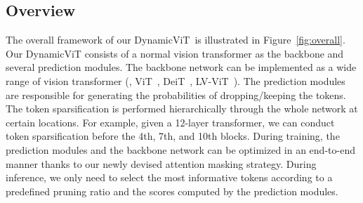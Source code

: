 \documentclass{article}
\newcommand{\dynamvit}{DynamicViT}
\begin{document}
\subsection{Overview}
The overall framework of our \dynamvit~is illustrated in Figure~\ref{fig:overall}. Our \dynamvit{} consists of a normal vision transformer as the backbone and several prediction modules. The backbone network can be implemented as a wide range of vision transformer (\eg, ViT~\cite{dosovitskiy2020vit}, DeiT~\cite{touvron2020deit}, LV-ViT~\cite{jiang2021token}). The prediction modules are responsible for generating the probabilities of dropping/keeping the tokens. The token sparsification is performed hierarchically through the whole network at certain locations. For example, given a 12-layer transformer, we can conduct token sparsification before the 4th, 7th, and 10th blocks. During training, the prediction modules and the backbone network can be optimized in an end-to-end manner thanks to our newly devised attention masking strategy. During inference, we only need to select the most informative tokens according to a predefined pruning ratio and the scores computed by the prediction modules. 
\end{document}
